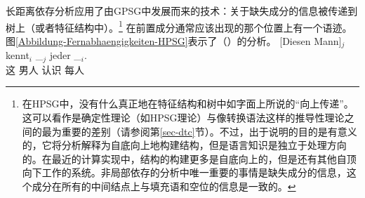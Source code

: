 长距离依存分析应用了由GPSG中发展而来的技术：关于缺失成分的信息被传递到树上（或者特征结构中）。\footnote{%
在HPSG中，没有什么真正地在特征结构和树中如字面上所说的“向上传递”。这可以看作是确定性理论（如HPSG理论）与像转换语法这样的推导性理论之间的最为重要的差别（请参阅第\ref{sec-dtc}节）。不过，出于说明的目的是有意义的，它将分析解释为自底向上地构建结构，但是语言知识是独立于处理方向的。在最近的计算实现中，结构的构建更多是自底向上的，但是还有其他自顶向下工作的系统。非局部依存的分析中唯一重要的事情是缺失成分的信息，这个成分在所有的中间结点上与填充语和空位的信息是一致的。
}
在前置成分通常应该出现的那个位置上有一个语迹。图\ref{Abbildung-Fernabhaengigkeiten-HPSG}表示了（）的分析。
\ea
\label{Beispiel-Diesen-Mann-kent-jeder-HPSG}
\gll {}[Diesen Mann]$_j$ kennt$_i$ \_$_j$ jeder \_$_i$.\\
	 {}\spacebr{}这 男人 认识 {} 每人\\
\z
